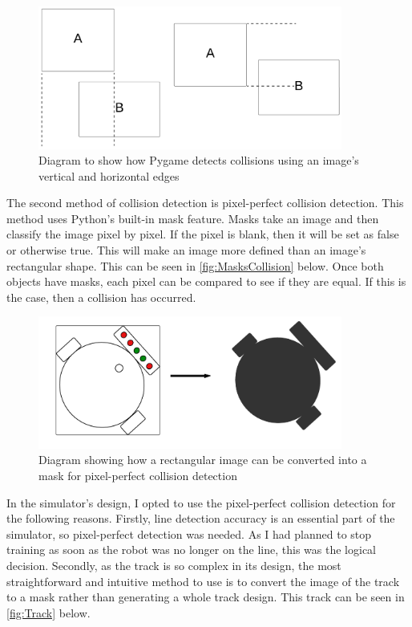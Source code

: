 \documentclass[a4paper,12pt]{article}
\begin{document}
 \begin{figure}[H]
 \centering
 \includegraphics[width=10cm]{imgs/RectCollision.png}
 \caption{Diagram to show how Pygame detects collisions using an image's vertical and horizontal edges}
 \label{fig:RectCollision}
 \end{figure}
\noindent
The second method of collision detection is pixel-perfect collision detection. This method uses Python's built-in mask feature. Masks take an image and then classify the image pixel by pixel. If the pixel is blank, then it will be set as false or otherwise true. This will make an image more defined than an image’s rectangular shape. This can be seen in \autoref{fig:MasksCollision} below. Once both objects have masks, each pixel can be compared to see if they are equal. If this is the case, then a collision has occurred.


 \begin{figure}[H]
 \centering
 \includegraphics[width=10cm]{imgs/MasksCollision.png}
 \caption{Diagram showing how a rectangular image can be converted into a mask for pixel-perfect collision detection}
 \label{fig:MasksCollision}
 \end{figure}
 \noindent
In the simulator's design, I opted to use the pixel-perfect collision detection for the following reasons. Firstly, line detection accuracy is an essential part of the simulator, so pixel-perfect detection was needed. As I had planned to stop training as soon as the robot was no longer on the line, this was the logical decision. Secondly, as the track is so complex in its design, the most straightforward and intuitive method to use is to convert the image of the track to a mask rather than generating a whole track design. This track can be seen in \autoref{fig:Track} below.
\end{document}
